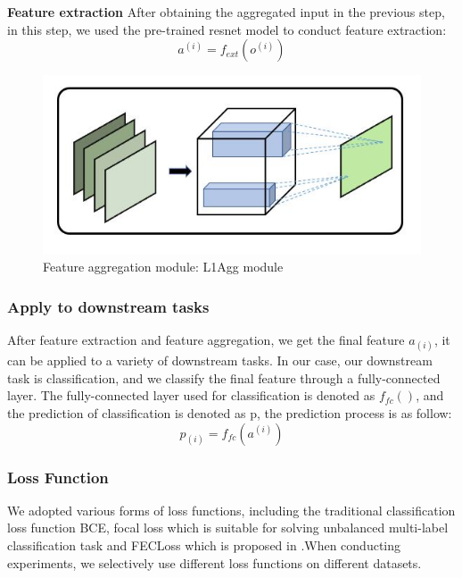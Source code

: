 \documentclass[10pt,twocolumn,letterpaper]{article}
\begin{document}
\textbf{Feature extraction}
After obtaining the aggregated input in the previous step, in this step, we used the pre-trained resnet model to conduct feature extraction:
\begin{equation}
    a^{(i)} = f_{ext}(o^{(i)})
\end{equation}

\begin{figure}[t]
\begin{center}
  \includegraphics[width=0.8\linewidth]{figure4.JPG}
\end{center}
   \caption{Feature aggregation module: L1Agg module}
\label{fig:long}
\label{fig:onecol}
\end{figure}

\subsubsection{Apply to downstream tasks}
After feature extraction and feature aggregation, we get the final feature $a_{(i)}$, it can be applied to a variety of downstream tasks. In our case, our downstream task is classification, and we classify the final feature through a fully-connected layer. The fully-connected layer used for classification is denoted as $f_{fc}()$, and the prediction of classification is denoted as p, the prediction process is as follow:
\begin{equation}
    p_{(i)} = f_{fc}(a^{(i)})
\end{equation}

\subsubsection{Loss Function}
We adopted various forms of loss functions, including the traditional classification loss function BCE, focal loss which is suitable for solving unbalanced multi-label classification task and FECLoss which is proposed in \cite{ref27}.When conducting experiments, we selectively use different loss functions on different datasets.
\end{document}
